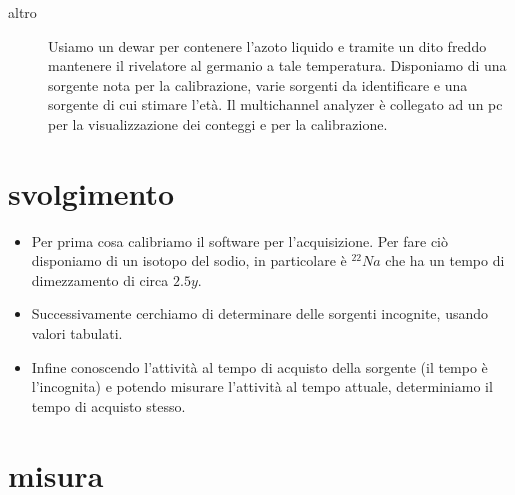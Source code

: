 \documentclass[11pt,a4paper]{article}
\begin{document}
\begin{description}
  \item [altro] Usiamo un dewar per contenere l'azoto liquido e tramite un dito freddo mantenere il rivelatore al germanio a tale temperatura. Disponiamo di una sorgente nota per la calibrazione, varie sorgenti da identificare e una sorgente di cui stimare l'età. Il multichannel analyzer è collegato ad un pc per la visualizzazione dei conteggi e per la calibrazione.
\end{description}

\section{svolgimento}
\begin{itemize}
  \item Per prima cosa calibriamo il software per l'acquisizione. Per fare ciò disponiamo di un isotopo del sodio, in particolare è $^{22}Na$ che ha un tempo di dimezzamento di circa $2.5y$.
  \item Successivamente cerchiamo di determinare delle sorgenti incognite, usando valori tabulati.
  \item Infine conoscendo l'attività al tempo di acquisto della sorgente (il tempo è l'incognita) e potendo misurare l'attività al tempo attuale, determiniamo il tempo di acquisto stesso.
\end{itemize}

\section{misura}
\end{document}
